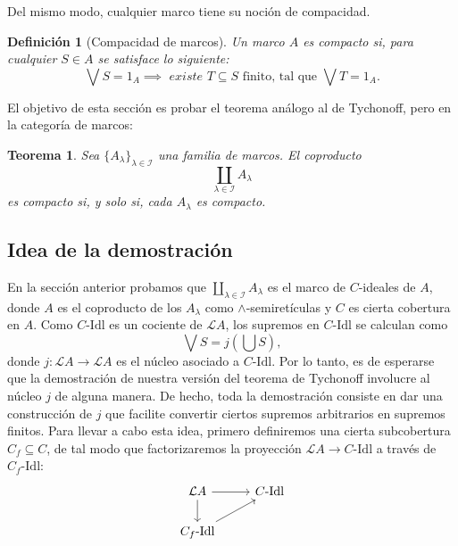 \documentclass[12pt,letterpaper,titlepage]{article}
\newtheorem*{defn}{Definición}
\newtheorem*{thm}{Teorema}
\theoremstyle{definition}
\newcommand\Sup{\bigvee}
\renewcommand\inf{\wedge}
\renewcommand\cal[1]{\mathcal{#1}}
\newcommand\scr[1]{\mathscr{#1}}
\newcommand\<{\langle}
\renewcommand\>{\rangle}
\newcommand\Idl{\text{-}\mathrm{Idl}}
\begin{document}
Del mismo modo, cualquier marco tiene su noción de compacidad.
\begin{defn}[Compacidad de marcos]
Un marco $A$ es compacto si, para cualquier $S\in A$
se satisface lo siguiente:
\[
    \Sup S= 1_A
    \implies
    \textit{ existe } T\subseteq S\text{ finito, tal que }
    \Sup T= 1_A
.\]
\end{defn}
El objetivo de esta sección es probar el teorema análogo
al de Tychonoff, pero en la categoría de marcos:
\begin{thm}
    Sea $\{A_\lambda\}_{\lambda\in\scr I}$ una familia de marcos.
    El coproducto
    \[
        \coprod_{\lambda\in\scr I}A_\lambda
    \]
    es compacto si, y solo si, cada $A_\lambda$ es compacto.
\end{thm}

\subsection{Idea de la demostración}

En la sección anterior probamos que
$\coprod_{\lambda\in\scr I}A_\lambda$
es el marco de $C$-ideales de $A$, donde $A$ es el coproducto
de los $A_\lambda$ como $\inf$-semiretículas y $C$ es cierta
cobertura en $A$.
Como $C\Idl$ es un cociente de $\cal LA$,
los supremos en $C\Idl$ se calculan como
\[
    \Sup S = j(\bigcup S)
,\]
donde $j:\cal LA\to\cal LA$ es el núcleo asociado a $C\Idl$.
Por lo tanto, es de esperarse que la demostración de
nuestra versión del teorema de Tychonoff involucre al núcleo
$j$ de alguna manera.
De hecho, toda la demostración consiste
en dar una construcción de $j$ que facilite convertir
ciertos supremos arbitrarios en supremos finitos.
Para llevar a cabo esta idea, primero definiremos una
cierta subcobertura $C_f\subseteq C$, de tal modo que
factorizaremos la proyección $\cal LA\to C\Idl$ a través de
$C_f\Idl$:
\[
    \begin{tikzcd}
        \cal LA \ar[d] \ar[r] & C\Idl \\
        C_f\Idl \ar[ur]
    \end{tikzcd}
\]
\end{document}
